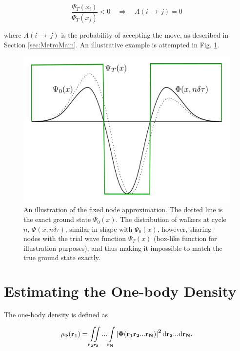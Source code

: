 \begin{equation}
\frac{\Psi_T(x_i)}{\Psi_T(x_j)} < 0 \quad\Longrightarrow\quad A(i\,\rightarrow\,j) = 0
\end{equation}

where $A(i\,\rightarrow\,j)$ is the probability of accepting the move, as described in Section \ref{sec:MetroMain}. An illustrative example is attempted in Fig. \ref{fig:fixxednode}.

\begin{figure}
 \begin{center}
  \includegraphics[scale=0.3]{../Graphics/fixxednode.pdf}
  \caption{An illustration of the fixed node approximation. The dotted line is the exact ground state $\Psi_0(x)$. The distribution of walkers at cycle $n$, $\Phi(x, n\delta\tau)$, similar in shape with $\Psi_0(x)$, however, sharing nodes with the trial wave function $\Psi_T(x)$ (box-like function for illustration purposes), and thus making it impossible to match the true ground state exactly.}
  \label{fig:fixxednode}
 \end{center}
\end{figure}


\section{Estimating the One-body Density}
\label{sec:OBD}

The one-body density is defined as

\begin{equation}
 \rho_\Phi(\bf r_1) = \iint\limits_{\bf r_2 \bf r_3}...\int\limits_{\bf r_N} \left|\Phi(\bf r_1 \bf r_2 ... \bf r_N)\right|^2\mathrm{d}\bf r_2...\mathrm{d}\bf r_N.
\end{equation}

